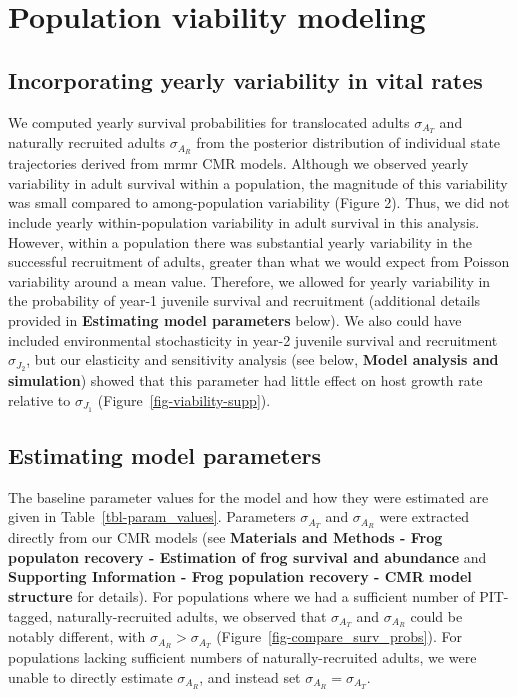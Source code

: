 \documentclass[9pt,twoside,lineno]{pnas-new-SI}
\begin{document}
\hypertarget{population-viability-modeling-1}{%
\section{Population viability
modeling}\label{population-viability-modeling-1}}

\hypertarget{incorporating-yearly-variability-in-vital-rates}{%
\subsection{Incorporating yearly variability in vital
rates}\label{incorporating-yearly-variability-in-vital-rates}}

We computed yearly survival probabilities for translocated adults
\(\sigma_{A_T}\) and naturally recruited adults \(\sigma_{A_R}\) from
the posterior distribution of individual state trajectories derived from
mrmr CMR models. Although we observed yearly variability in adult
survival within a population, the magnitude of this variability was
small compared to among-population variability
(Figure 2). Thus, we did not include
yearly within-population variability in adult survival in this analysis.
However, within a population there was substantial yearly variability in
the successful recruitment of adults, greater than what we would expect
from Poisson variability around a mean value. Therefore, we allowed for
yearly variability in the probability of year-1 juvenile survival and
recruitment (additional details provided in \textbf{Estimating model
parameters} below). We also could have included environmental
stochasticity in year-2 juvenile survival and recruitment
\(\sigma_{J_2}\), but our elasticity and sensitivity analysis (see
below, \textbf{Model analysis and simulation}) showed that this
parameter had little effect on host growth rate relative to
\(\sigma_{J_1}\) (Figure~\ref{fig-viability-supp}).

\hypertarget{estimating-model-parameters}{%
\subsection{Estimating model
parameters}\label{estimating-model-parameters}}

The baseline parameter values for the model and how they were estimated
are given in Table~\ref{tbl-param_values}. Parameters \(\sigma_{A_T}\)
and \(\sigma_{A_R}\) were extracted directly from our CMR models (see
\textbf{Materials and Methods - Frog populaton recovery - Estimation of
frog survival and abundance} and \textbf{Supporting Information - Frog
population recovery - CMR model structure} for details). For populations
where we had a sufficient number of PIT-tagged, naturally-recruited
adults, we observed that \(\sigma_{A_T}\) and \(\sigma_{A_R}\) could be
notably different, with \(\sigma_{A_R} > \sigma_{A_T}\)
(Figure~\ref{fig-compare_surv_probs}). For populations lacking
sufficient numbers of naturally-recruited adults, we were unable to
directly estimate \(\sigma_{A_R}\), and instead set
\(\sigma_{A_R} = \sigma_{A_T}\).
\end{document}
